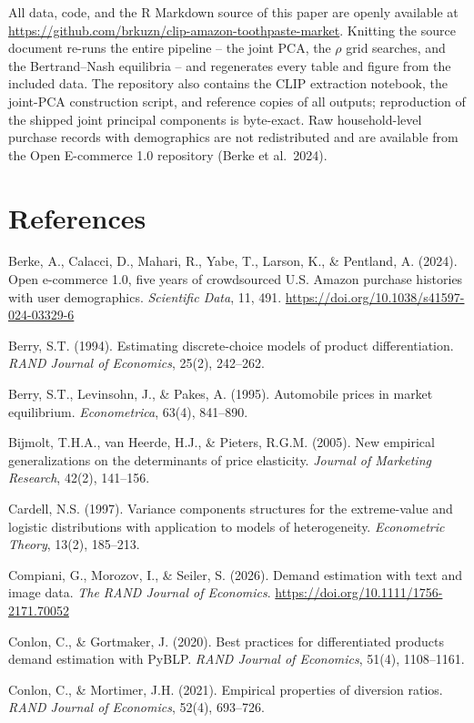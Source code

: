 All data, code, and the R Markdown source of this paper are openly
available at
\url{https://github.com/brkuzn/clip-amazon-toothpaste-market}. Knitting
the source document re-runs the entire pipeline -- the joint PCA, the
\(\rho\) grid searches, and the Bertrand--Nash equilibria -- and
regenerates every table and figure from the included data. The
repository also contains the CLIP extraction notebook, the joint-PCA
construction script, and reference copies of all outputs; reproduction
of the shipped joint principal components is byte-exact. Raw
household-level purchase records with demographics are not redistributed
and are available from the Open E-commerce 1.0 repository (Berke et
al.~2024).

\chapter*{References}\label{references}

Berke, A., Calacci, D., Mahari, R., Yabe, T., Larson, K., \& Pentland,
A. (2024). Open e-commerce 1.0, five years of crowdsourced U.S. Amazon
purchase histories with user demographics. \emph{Scientific Data}, 11,
491. \url{https://doi.org/10.1038/s41597-024-03329-6}

Berry, S.T. (1994). Estimating discrete-choice models of product
differentiation. \emph{RAND Journal of Economics}, 25(2), 242--262.

Berry, S.T., Levinsohn, J., \& Pakes, A. (1995). Automobile prices in
market equilibrium. \emph{Econometrica}, 63(4), 841--890.

Bijmolt, T.H.A., van Heerde, H.J., \& Pieters, R.G.M. (2005). New
empirical generalizations on the determinants of price elasticity.
\emph{Journal of Marketing Research}, 42(2), 141--156.

Cardell, N.S. (1997). Variance components structures for the
extreme-value and logistic distributions with application to models of
heterogeneity. \emph{Econometric Theory}, 13(2), 185--213.

Compiani, G., Morozov, I., \& Seiler, S. (2026). Demand estimation with
text and image data. \emph{The RAND Journal of Economics}.
\url{https://doi.org/10.1111/1756-2171.70052}

Conlon, C., \& Gortmaker, J. (2020). Best practices for differentiated
products demand estimation with PyBLP. \emph{RAND Journal of Economics},
51(4), 1108--1161.

Conlon, C., \& Mortimer, J.H. (2021). Empirical properties of diversion
ratios. \emph{RAND Journal of Economics}, 52(4), 693--726.

